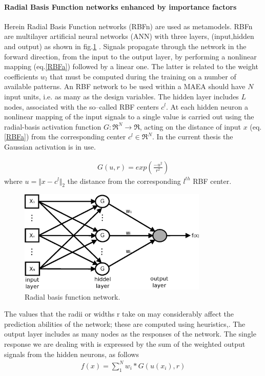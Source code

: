 \paragraph{Radial Basis Function networks enhanced by importance factors}
Herein Radial Basis Function networks (RBFn) are used as metamodels. RBFn are multilayer artificial neural networks (ANN) with three layers, (input,hidden and output) as shown in fig.\ref{rbf1} \cite{Haykin}. Signals propagate through the network in the forward direction, from the input to the output layer, by performing a nonlinear mapping (eq.\ref{RBFa}) followed by a linear one. The latter is related to the weight coefficients $w_l$ that must be computed during the training on a number of available patterns. An RBF network to be used within a MAEA should have $N$ input units, i.e. as many as the  design variables. The hidden layer includes $L$ nodes, associated with the so–called RBF centers $c^l$. At each hidden neuron a nonlinear mapping of the input signals to a single value is carried out using the radial-basis activation function $G:\Re^N \rightarrow \Re$, acting on the distance of input $x$ (eq.\ref{RBFa}) from the corresponding center $c^l \in \Re^N$.  In the current thesis the Gaussian activation is in use. 

\begin{eqnarray}
	G(u,r)=exp(\frac{-u^2}{r^2})
	\label{RBFa}
\end{eqnarray}  
where $u=\Vert x-c^l \Vert_2$ the distance from the corresponding $l^{th}$ RBF center.

\begin{figure}[h!]
\centering
\includegraphics[width=90mm]{RBF.eps} 
\caption{Radial basis function network.}
\label{rbf1}
\end{figure}
The values that the radii or widths r take on may considerably affect the prediction abilities of the network; these are computed using heuristics,\cite{Haykin}. The output layer includes as many nodes as the responses of the network. The single response we are dealing with is expressed by the sum of the weighted output signals from the hidden neurons, as follows             
\begin{eqnarray}
	f(x)=\sum _1^N w_i*G(u(x_i),r)
\end{eqnarray}  


